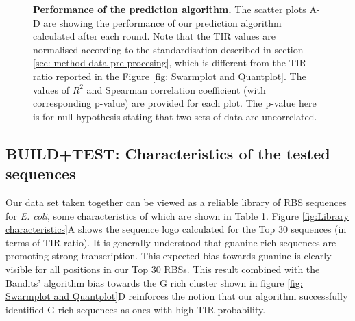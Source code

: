 \documentclass{article}
\begin{document}
\begin{figure}[!ht]
\begin{subfigure}[b]{0.49\textwidth}
    \end{subfigure}
    \caption{\textbf{Performance of the prediction algorithm.} The scatter plots A-D are showing the performance of our prediction algorithm calculated after each round.
    Note that the TIR values are normalised according to the standardisation described in section \ref{sec: method data pre-procesing}, which is different from the TIR ratio reported in the Figure \ref{fig: Swarmplot and Quantplot}.
    The values of $R^2$ and Spearman correlation coefficient (with corresponding p-value) are provided for each plot.
    The p-value here is for null hypothesis stating that two sets of data are uncorrelated.
    }
    \label{fig: Scatterplot}
\end{figure}

\subsection{BUILD+TEST: Characteristics of the tested sequences}
\label{sec:characteristics-of-library}

Our data set taken together can be viewed as a reliable library of RBS sequences for \emph{E. coli}, some characteristics of which are shown in Table 1.
Figure \ref{fig:Library characteristics}A shows the sequence logo calculated for the Top 30 sequences (in terms of TIR ratio).
It is generally understood that guanine rich sequences are promoting strong transcription.
This expected bias towards guanine is clearly visible for all positions in our Top 30 RBSs.
This result combined with the Bandits' algorithm bias towards the G rich cluster shown in figure \ref{fig: Swarmplot and Quantplot}D reinforces the notion that our algorithm successfully identified G rich sequences as ones with high TIR probability.
\end{document}
